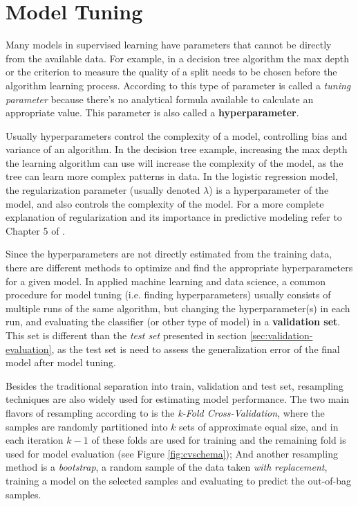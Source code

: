\section{Model Tuning}

Many models in supervised learning have parameters that cannot be directly from the available data. For example, in a decision tree algorithm the max depth or the criterion to measure the quality of a split needs to be chosen before the algorithm learning process. According to \cite{kuhn2013applied} this type of parameter is called a \textit{tuning parameter} because there's no analytical formula available to calculate an appropriate value. This parameter is also called a \textbf{hyperparameter}. 

Usually hyperparameters control the complexity of a model, controlling bias and variance of an algorithm. In the decision tree example, increasing the max depth the learning algorithm can use will increase the complexity of the model, as the tree can learn more complex patterns in data. In the logistic regression model, the regularization parameter (usually denoted $\lambda$) is a hyperparameter of the model, and also controls the complexity of the model. For a more complete explanation of regularization and its importance in predictive modeling refer to Chapter 5 of \cite{hastie2009elements}.

Since the hyperparameters are not directly estimated from the training data, there are different methods to optimize and find the appropriate hyperparameters for a given model. In applied machine learning and data science, a common procedure for model tuning (i.e. finding hyperparameters) usually consists of multiple runs of the same algorithm, but changing the hyperparameter(s) in each run, and evaluating the classifier (or other type of model) in a \textbf{validation set}. This set is different than the \textit{test set} presented in section \ref{sec:validation-evaluation}, as the test set is need to assess the generalization error of the final model after model tuning. 

Besides the traditional separation into train, validation and test set, resampling techniques are also widely used for estimating model performance. The two main flavors of resampling according to \cite{kuhn2013applied} is the \textit{k-Fold Cross-Validation}, where the samples are randomly partitioned into $k$ sets of approximate equal size, and in each iteration $k - 1$ of these folds are used for training and the remaining fold is used for model evaluation (see Figure \ref{fig:cvschema}); And another resampling method is a \textit{bootstrap}, a random sample of the data taken \textit{with replacement}, training a model on the selected samples and evaluating to predict the out-of-bag samples.

